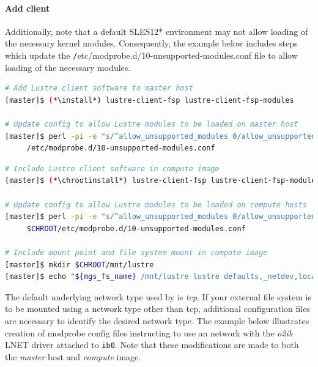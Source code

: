 \documentclass[letterpaper]{article}
\newcommand{\baseOS}{SLES12*}
\newcommand{\install}{zypper -n install}
\newcommand{\chrootinstall}{zypper -n --root \$CHROOT install}
\begin{document}
\paragraph{Add \Lustre{} client} \label{sec:lustre_client}


Additionally, note that a default \baseOS{} environment may not allow loading of
the necessary \Lustre{} kernel modules. Consequently, the example below includes
steps which update the {\texttt /etc/modprobe.d/10-unsupported-modules.conf}
file to allow loading of the necessary modules.

\newpage
\begin{lstlisting}[language=bash,keywords={},upquote=true]
# Add Lustre client software to master host
[master]$ (*\install*) lustre-client-fsp lustre-client-fsp-modules

# Update config to allow Lustre modules to be loaded on master host
[master]$ perl -pi -e "s/^allow_unsupported_modules 0/allow_unsupported_modules 1/" \
     /etc/modprobe.d/10-unsupported-modules.conf
\end{lstlisting}

\begin{lstlisting}[language=bash,keywords={},upquote=true]
# Include Lustre client software in compute image
[master]$ (*\chrootinstall*) lustre-client-fsp lustre-client-fsp-modules

# Update config to allow Lustre modules to be loaded on compute hosts
[master]$ perl -pi -e "s/^allow_unsupported_modules 0/allow_unsupported_modules 1/" \
     $CHROOT/etc/modprobe.d/10-unsupported-modules.conf

# Include mount point and file system mount in compute image
[master]$ mkdir $CHROOT/mnt/lustre
[master]$ echo "${mgs_fs_name} /mnt/lustre lustre defaults,_netdev,localflock 0 0" >> $CHROOT/etc/fstab
\end{lstlisting}

The default underlying network type used by \Lustre{} is {\em tcp}. If your
external \Lustre{} file system is to be mounted using a network type other than
tcp, additional configuration files are necessary to identify the desired
network type. The example below illustrates creation of modprobe config files
instructing \Lustre{} to use an \InfiniBand{} network with the {\em o2ib} LNET driver
attached to \texttt{ib0}. Note that these modifications are made to both the
{\em master} host and {\em compute} image.
\end{document}

